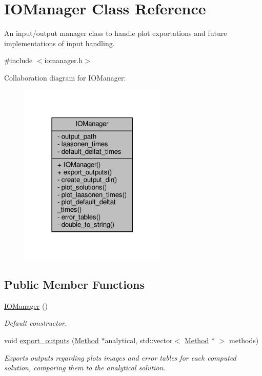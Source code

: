 \hypertarget{classIOManager}{}\section{I\+O\+Manager Class Reference}
\label{classIOManager}


An input/output manager class to handle plot exportations and future implementations of input handling.  




{\ttfamily \#include $<$iomanager.\+h$>$}



Collaboration diagram for I\+O\+Manager\+:
\nopagebreak
\begin{figure}[H]
\begin{center}
\leavevmode
\includegraphics[width=198pt]{classIOManager__coll__graph}
\end{center}
\end{figure}
\subsection*{Public Member Functions}
\begin{DoxyCompactItemize}
\item 
\hyperlink{classIOManager_afce14d2f016545728fee1e48b74f431c}{I\+O\+Manager} ()
\begin{DoxyCompactList}\small\item\em Default constructor. \end{DoxyCompactList}\item 
void \hyperlink{classIOManager_ac4c42d2c5d93f7031447be7845bf2036}{export\+\_\+outputs} (\hyperlink{classMethod}{Method} $\ast$analytical, std\+::vector$<$ \hyperlink{classMethod}{Method} $\ast$ $>$ methods)
\begin{DoxyCompactList}\small\item\em Exports outputs regarding plots images and error tables for each computed solution, comparing them to the analytical solution. \end{DoxyCompactList}\end{DoxyCompactItemize}
